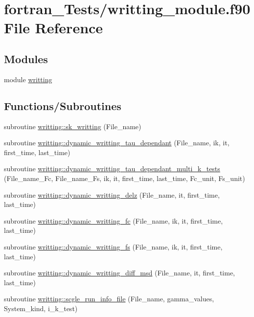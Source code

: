 \hypertarget{writting__module_8f90}{}\section{fortran\+\_\+\+Tests/writting\+\_\+module.f90 File Reference}
\label{writting__module_8f90}
\subsection*{Modules}
\begin{DoxyCompactItemize}
\item 
module \hyperlink{namespacewritting}{writting}
\end{DoxyCompactItemize}
\subsection*{Functions/\+Subroutines}
\begin{DoxyCompactItemize}
\item 
subroutine \hyperlink{namespacewritting_ac60f4c3f240b81920461d758274edac0}{writting\+::sk\+\_\+writting} (File\+\_\+name)
\item 
subroutine \hyperlink{namespacewritting_a3e320a8d95fe5b453cc9f380aeb87a68}{writting\+::dynamic\+\_\+writting\+\_\+tau\+\_\+dependant} (File\+\_\+name, ik, it, first\+\_\+time, last\+\_\+time)
\item 
subroutine \hyperlink{namespacewritting_a4e9cdb11192a6b8fc7a3af6a67ce773b}{writting\+::dynamic\+\_\+writting\+\_\+tau\+\_\+dependant\+\_\+multi\+\_\+k\+\_\+tests} (File\+\_\+name\+\_\+\+Fc, File\+\_\+name\+\_\+\+Fs, ik, it, first\+\_\+time, last\+\_\+time, Fc\+\_\+unit, Fs\+\_\+unit)
\item 
subroutine \hyperlink{namespacewritting_aeb136050af8a6d0d64132a6bc05590df}{writting\+::dynamic\+\_\+writting\+\_\+delz} (File\+\_\+name, it, first\+\_\+time, last\+\_\+time)
\item 
subroutine \hyperlink{namespacewritting_ac706161f1529b1393a6752a62257fc5f}{writting\+::dynamic\+\_\+writting\+\_\+fc} (File\+\_\+name, ik, it, first\+\_\+time, last\+\_\+time)
\item 
subroutine \hyperlink{namespacewritting_a6c54bdbe9174c5e33fe462aea3b3dbf9}{writting\+::dynamic\+\_\+writting\+\_\+fs} (File\+\_\+name, ik, it, first\+\_\+time, last\+\_\+time)
\item 
subroutine \hyperlink{namespacewritting_a9228ce062a7c2c0c5362a8b0681d173d}{writting\+::dynamic\+\_\+writting\+\_\+diff\+\_\+msd} (File\+\_\+name, it, first\+\_\+time, last\+\_\+time)
\item 
subroutine \hyperlink{namespacewritting_a68bba6383eed5b32fc431942d88fe477}{writting\+::scgle\+\_\+run\+\_\+info\+\_\+file} (File\+\_\+name, gamma\+\_\+values, System\+\_\+kind, i\+\_\+k\+\_\+test)
\end{DoxyCompactItemize}
